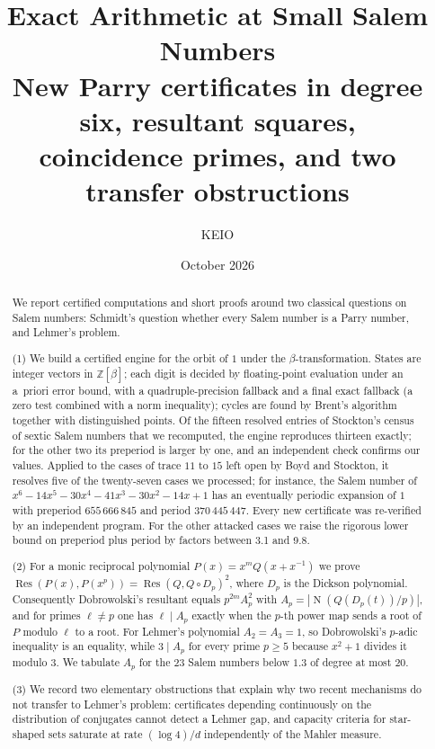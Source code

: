 \documentclass[11pt]{amsart}
\title[Exact arithmetic at small Salem numbers]{Exact Arithmetic at Small Salem Numbers\\[2pt]
\large New Parry certificates in degree six, resultant squares,\\ coincidence primes, and two transfer obstructions}
\author{KEIO}
\date{October 2026}
\theoremstyle{definition}
\theoremstyle{remark}
\DeclareMathOperator{\Res}{Res}
\DeclareMathOperator{\Nm}{N}
\newcommand{\Z}{\mathbb Z}
\begin{document}
\begin{abstract}
We report certified computations and short proofs around two classical questions on Salem numbers: Schmidt's question whether every Salem number is a Parry number, and Lehmer's problem.

(1) We build a certified engine for the orbit of $1$ under the $\beta$-transformation. States are integer vectors in $\Z[\beta]$; each digit is decided by floating-point evaluation under an a~priori error bound, with a quadruple-precision fallback and a final exact fallback (a zero test combined with a norm inequality); cycles are found by Brent's algorithm together with distinguished points. Of the fifteen resolved entries of Stockton's census of sextic Salem numbers that we recomputed, the engine reproduces thirteen exactly; for the other two its preperiod is larger by one, and an independent check confirms our values. Applied to the cases of trace $11$ to $15$ left open by Boyd and Stockton, it resolves five of the twenty-seven cases we processed; for instance, the Salem number of $x^6-14x^5-30x^4-41x^3-30x^2-14x+1$ has an eventually periodic expansion of $1$ with preperiod $655\,666\,845$ and period $370\,445\,447$. Every new certificate was re-verified by an independent program. For the other attacked cases we raise the rigorous lower bound on preperiod plus period by factors between 3.1 and 9.8.

(2) For a monic reciprocal polynomial $P(x)=x^mQ(x+x^{-1})$ we prove $\Res(P(x),P(x^p))=\Res(Q,Q\circ D_p)^2$, where $D_p$ is the Dickson polynomial. Consequently Dobrowolski's resultant equals $p^{2m}A_p^2$ with $A_p=|\Nm(Q(D_p(t))/p)|$, and for primes $\ell\neq p$ one has $\ell\mid A_p$ exactly when the $p$-th power map sends a root of $P$ modulo $\ell$ to a root. For Lehmer's polynomial $A_2=A_3=1$, so Dobrowolski's $p$-adic inequality is an equality, while $3\mid A_p$ for every prime $p\ge5$ because $x^2+1$ divides it modulo $3$. We tabulate $A_p$ for the $23$ Salem numbers below $1.3$ of degree at most $20$.

(3) We record two elementary obstructions that explain why two recent mechanisms do not transfer to Lehmer's problem: certificates depending continuously on the distribution of conjugates cannot detect a Lehmer gap, and capacity criteria for star-shaped sets saturate at rate $(\log 4)/d$ independently of the Mahler measure.
\end{abstract}

\maketitle
\end{document}
